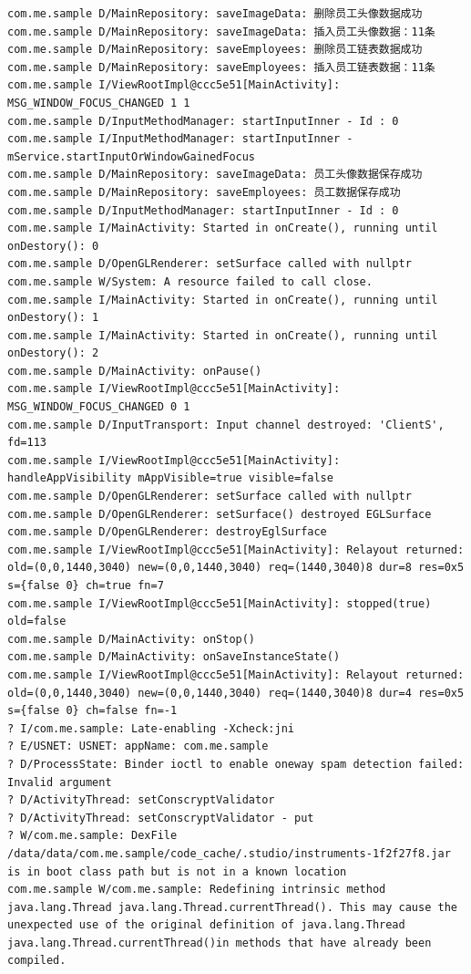 \documentclass[9pt, b5paper]{article}
\begin{document}
\begin{verbatim}
com.me.sample D/MainRepository: saveImageData: 删除员工头像数据成功
com.me.sample D/MainRepository: saveImageData: 插入员工头像数据：11条
com.me.sample D/MainRepository: saveEmployees: 删除员工链表数据成功
com.me.sample D/MainRepository: saveEmployees: 插入员工链表数据：11条
com.me.sample I/ViewRootImpl@ccc5e51[MainActivity]: MSG_WINDOW_FOCUS_CHANGED 1 1
com.me.sample D/InputMethodManager: startInputInner - Id : 0
com.me.sample I/InputMethodManager: startInputInner - mService.startInputOrWindowGainedFocus
com.me.sample D/MainRepository: saveImageData: 员工头像数据保存成功
com.me.sample D/MainRepository: saveEmployees: 员工数据保存成功
com.me.sample D/InputMethodManager: startInputInner - Id : 0
com.me.sample I/MainActivity: Started in onCreate(), running until onDestory(): 0
com.me.sample D/OpenGLRenderer: setSurface called with nullptr
com.me.sample W/System: A resource failed to call close. 
com.me.sample I/MainActivity: Started in onCreate(), running until onDestory(): 1
com.me.sample I/MainActivity: Started in onCreate(), running until onDestory(): 2
com.me.sample D/MainActivity: onPause() 
com.me.sample I/ViewRootImpl@ccc5e51[MainActivity]: MSG_WINDOW_FOCUS_CHANGED 0 1
com.me.sample D/InputTransport: Input channel destroyed: 'ClientS', fd=113
com.me.sample I/ViewRootImpl@ccc5e51[MainActivity]: handleAppVisibility mAppVisible=true visible=false
com.me.sample D/OpenGLRenderer: setSurface called with nullptr
com.me.sample D/OpenGLRenderer: setSurface() destroyed EGLSurface
com.me.sample D/OpenGLRenderer: destroyEglSurface
com.me.sample I/ViewRootImpl@ccc5e51[MainActivity]: Relayout returned: old=(0,0,1440,3040) new=(0,0,1440,3040) req=(1440,3040)8 dur=8 res=0x5 s={false 0} ch=true fn=7
com.me.sample I/ViewRootImpl@ccc5e51[MainActivity]: stopped(true) old=false
com.me.sample D/MainActivity: onStop() 
com.me.sample D/MainActivity: onSaveInstanceState()
com.me.sample I/ViewRootImpl@ccc5e51[MainActivity]: Relayout returned: old=(0,0,1440,3040) new=(0,0,1440,3040) req=(1440,3040)8 dur=4 res=0x5 s={false 0} ch=false fn=-1
? I/com.me.sample: Late-enabling -Xcheck:jni
? E/USNET: USNET: appName: com.me.sample
? D/ProcessState: Binder ioctl to enable oneway spam detection failed: Invalid argument
? D/ActivityThread: setConscryptValidator
? D/ActivityThread: setConscryptValidator - put
? W/com.me.sample: DexFile /data/data/com.me.sample/code_cache/.studio/instruments-1f2f27f8.jar is in boot class path but is not in a known location
com.me.sample W/com.me.sample: Redefining intrinsic method java.lang.Thread java.lang.Thread.currentThread(). This may cause the unexpected use of the original definition of java.lang.Thread java.lang.Thread.currentThread()in methods that have already been compiled.

\end{verbatim}
\end{document}
